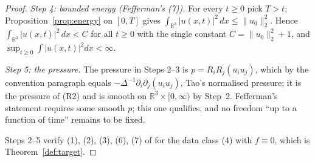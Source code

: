\documentclass[11pt]{article}
\theoremstyle{definition}
\theoremstyle{plain}
\newcommand{\R}{\mathbb R}
\newcommand{\norm}[1]{\lVert #1\rVert}
\begin{document}
\begin{proof}
\emph{Step 4: bounded energy (Fefferman's (7)).}  For every $t\geq0$ pick
$T>t$; Proposition~\ref{prop:energy} on $[0,T]$ gives
$\int_{\R^3}|u(x,t)|^2\,dx\leq\norm{u_0}_2^2$.  Hence
$\int_{\R^3}|u(x,t)|^2\,dx<C$ for all $t\geq0$ with the single constant
$C=\norm{u_0}_2^2+1$, and $\sup_{t\geq0}\int|u(x,t)|^2dx<\infty$.

\emph{Step 5: the pressure.}  The pressure in Steps 2--3 is
$p=R_iR_j(u_iu_j)$, which by the convention paragraph equals
$-\Delta^{-1}\partial_i\partial_j(u_iu_j)$, Tao's normalised pressure; it is
the pressure of (R2) and is smooth on $\R^3\times[0,\infty)$ by Step~2.
Fefferman's statement requires some smooth $p$; this one qualifies, and no
freedom ``up to a function of time'' remains to be fixed.

Steps 2--5 verify (1), (2), (3), (6), (7) of \cite[pp.~57--58]{Fefferman2000}
for the data class (4) with $f\equiv0$, which is Theorem~\ref{def:target}.
\end{proof}
\end{document}
